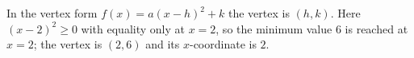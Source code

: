 In the vertex form $f(x)=a(x-h)^2+k$ the vertex is $(h,k)$. Here $(x-2)^2\ge0$ with equality only at $x=2$, so the minimum value $6$ is reached at $x=2$; the vertex is $(2,6)$ and its $x$-coordinate is $\boxed{2}$.
